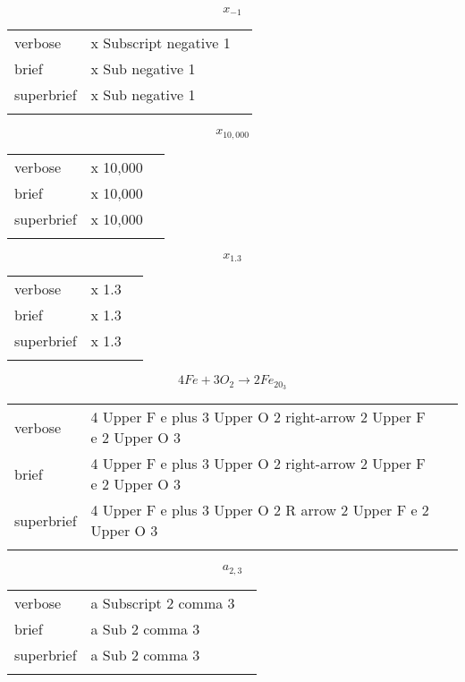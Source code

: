\E \[x_{-1}\]
\begin{longtable}[c]{@{}lll@{}}
\toprule\addlinespace
verbose & x Subscript negative 1 &

\\\addlinespace
brief & x Sub negative 1 &

\\\addlinespace
superbrief & x Sub negative 1 &

\\\addlinespace
\bottomrule
\end{longtable}


\E \[x_{10,000}\]
\begin{longtable}[c]{@{}lll@{}}
\toprule\addlinespace
verbose & x 10,000 &

\\\addlinespace
brief & x 10,000 &

\\\addlinespace
superbrief & x 10,000 &

\\\addlinespace
\bottomrule
\end{longtable}


\E \[x_{1.3}\]
\begin{longtable}[c]{@{}lll@{}}
\toprule\addlinespace
verbose & x 1.3 &

\\\addlinespace
brief & x 1.3 &

\\\addlinespace
superbrief & x 1.3 &

\\\addlinespace
\bottomrule
\end{longtable}


\E \[4Fe + 3O_2 \to 2Fe_20_3\]
\begin{longtable}[c]{@{}lll@{}}
\toprule\addlinespace
verbose & 4 Upper F e plus 3 Upper O 2 right-arrow 2 Upper F e 2 Upper O
3 &

\\\addlinespace
brief & 4 Upper F e plus 3 Upper O 2 right-arrow 2 Upper F e 2 Upper O 3
&

\\\addlinespace
superbrief & 4 Upper F e plus 3 Upper O 2 R arrow 2 Upper F e 2 Upper O
3 &

\\\addlinespace
\bottomrule
\end{longtable}


\E \[a_{2,3}\]
\begin{longtable}[c]{@{}lll@{}}
\toprule\addlinespace
verbose & a Subscript 2 comma 3 &

\\\addlinespace
brief & a Sub 2 comma 3 &

\\\addlinespace
superbrief & a Sub 2 comma 3 &

\\\addlinespace
\bottomrule
\end{longtable}


